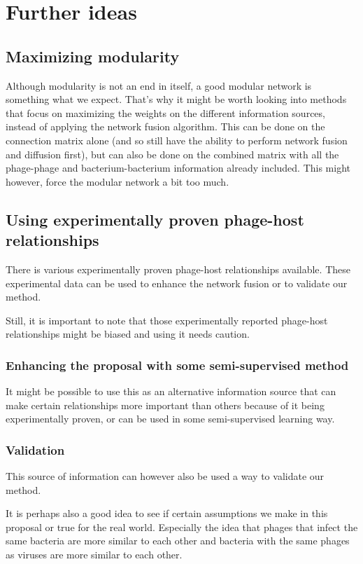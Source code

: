 \documentclass{article}
\begin{document}
\section{Further ideas}

\subsection{Maximizing modularity}

Although modularity is not an end in itself, a good modular network is
something what we expect. That's why it might be worth looking into methods 
that focus on maximizing
the weights on the different information sources, 
instead of applying the network fusion algorithm.
This can be done on the connection matrix alone 
(and so still have the ability to perform network fusion and diffusion first),
but can also be done on the combined matrix with 
all the phage-phage and bacterium-bacterium information already included.  
This might however, force the modular network a bit too much.

\subsection{Using experimentally proven phage-host relationships}

There is various experimentally proven phage-host relationships available. 
These experimental data can be used to enhance the network fusion or 
to validate our method. 

Still, it is important to note that those experimentally reported phage-host
relationships might be biased and using it needs caution.

\subsubsection{Enhancing the proposal with some semi-supervised method}
It might be possible to use this as an alternative information source that
can make certain relationships more important than others because
of it being experimentally proven, or can be used in some semi-supervised
learning way.

\subsubsection{Validation}

This source of information can however also be used a way to validate
our method. 

It is perhaps also a good idea to see if certain assumptions we make in 
this proposal or true for the real world. 
Especially the idea that phages that infect the same
bacteria are more similar to each other and bacteria with the same phages
as viruses are more similar to each other.

\printbibliography{}
\end{document}
